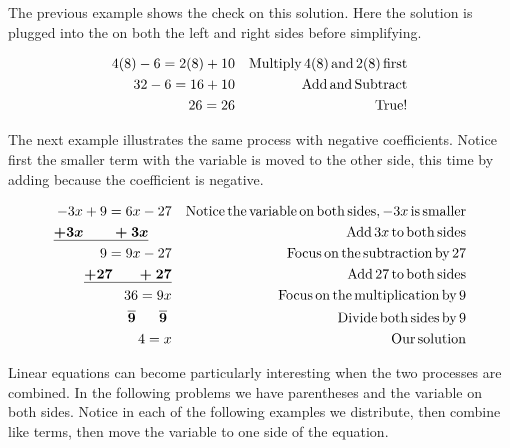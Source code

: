  The previous example shows the check on this solution. Here the solution is
plugged into the {} on both the left and right sides before
simplifying.

\begin{example}\label{Lin22}

\begin{eqnarray*}
  4 (8) - 6 = 2 (8) + 10 &  & \operatorname{Multiply} 4 (8) \operatorname{and} 2 (8)
  \operatorname{first}\\
  32 - 6 = 16 + 10 &  & \operatorname{Add} \operatorname{and} \operatorname{Subtract}\\
  26 = 26 &  & \operatorname{True} !
\end{eqnarray*}
\end{example}

 The next example illustrates the same process with negative coefficients.
Notice first the smaller term with the variable is moved to the other side,
this time by adding because the coefficient is negative.

\begin{example}\label{Lin23}
  
  \begin{eqnarray*}
    - 3 x + 9 = 6 x - 27 &  & \operatorname{Notice} \operatorname{the} \operatorname{variable}
    \operatorname{on} \operatorname{both} \operatorname{sides}, - 3 x \operatorname{is} \operatorname{smaller}\\
    \boldsymbol{\underline{+ 3 x ~~~~~~+ 3 x}}~~~~~  &  & \operatorname{Add} 3 x \operatorname{to}
    \operatorname{both} \operatorname{sides}\\
    9 = 9 x - 27 &  & \operatorname{Focus} \operatorname{on} \operatorname{the} \operatorname{subtraction}
    \operatorname{by} 27\\
    \boldsymbol{\underline{+ 27 ~~~~~+ 27}} &  & \operatorname{Add} 27 \operatorname{to} \operatorname{both}
    \operatorname{sides}\\
    36 = 9 x &  & \operatorname{Focus} \operatorname{on} \operatorname{the} \operatorname{multiplication}
    \operatorname{by} 9\\
    \boldsymbol{\overline{9} ~~~~~ \overline{9} }~  &  & \operatorname{Divide} \operatorname{both}
    \operatorname{sides} \operatorname{by} 9\\
    4 = x &  & \operatorname{Our} \operatorname{solution}
  \end{eqnarray*}
\end{example}

 Linear equations can become particularly interesting when the two processes are
combined. In the following problems we have parentheses and the variable on
both sides. Notice in each of the following examples we distribute, then
combine like terms, then move the variable to one side of the equation.

